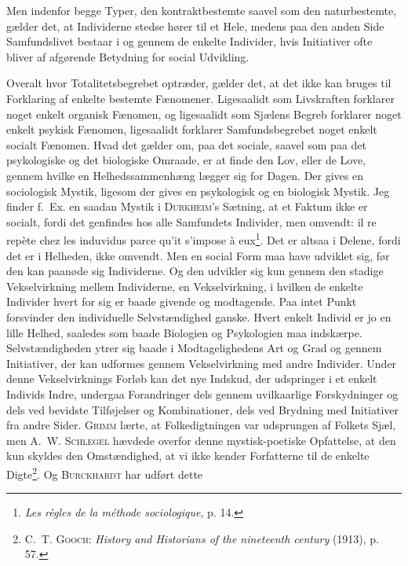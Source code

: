 \documentclass[12pt]{article}
\newcommand{\opage}[1]{\marginnote{\footnotesize\textit{[#1]}}}
\begin{document}
Men indenfor begge Typer, den kontraktbestemte saavel som den naturbestemte,
gælder det, at Individerne stedse hører til et Hele, medens paa den anden Side
Samfundslivet bestaar i og gennem de enkelte Individer, hvis Initiativer ofte
bliver af afgørende Betydning for social Udvikling.

Overalt hvor Totalitetsbegrebet optræder, gælder det, at det ikke kan bruges
til Forklaring af enkelte bestemte Fænomener. Ligesaalidt som Livskraften
forklarer noget enkelt organisk Fænomen, og ligesaalidt som Sjælens Begreb
forklarer noget enkelt psykisk Fænomen, ligesaalidt forklarer Samfundsbegrebet
noget enkelt socialt Fænomen. Hvad det gælder om, paa det sociale, saavel som paa
det psykologiske og det biologiske Omraade, er at finde den Lov, eller de Love,
gennem hvilke en Helhedssammenhæng lægger sig for Dagen. Der gives en sociologisk
\setcounter{footnote}{0}%
\opage{62}Mystik, ligesom der gives en psykologisk og en biologisk Mystik. Jeg finder
f.~Ex. en saadan Mystik i \textsc{Durkheim}'s Sætning, at et Faktum ikke er
socialt, fordi det genfindes hos alle Samfundets Individer, men omvendt:
il re repète chez les induvidus parce qu'it s'impose à
eux\footnote{\textit{Les règles de la méthode sociologique}, p. 14.}. Det er altsaa
i Delene, fordi det er i Helheden, ikke omvendt. Men en social Form maa have
udviklet sig, før den kan paanøde sig Individerne. Og den udvikler sig kun gennem
den stadige Vekselvirkning mellem Individerne, en Vekselvirkning, i hvilken de
enkelte Individer hvert for sig er baade givende og modtagende. Paa intet Punkt
forsvinder den individuelle Selvstændighed ganske. Hvert enkelt Individ er jo en
lille Helhed, saaledes som baade Biologien og Psykologien maa indskærpe.
Selvstændigheden ytrer sig baade i Modtagelighedens Art og Grad og gennem
Initiativer, der kan udformes gennem Vekselvirkning med andre Individer. Under
denne Vekselvirknings Forløb kan det nye Indskud, der udspringer i et enkelt
Individs Indre, undergaa Forandringer dels gennem uvilkaarlige Forskydninger og
dels ved bevidste Tilføjelser og Kombinationer, dels ved Brydning med Initiativer
fra andre Sider. \textsc{Grimm} lærte, at Folkedigtningen var udsprungen af
Folkets Sjæl, men \textsc{A.~W. Schlegel} hævdede overfor denne mystisk-poetiske
Opfattelse, at den kun skyldes den Omstændighed, at vi ikke kender Forfatterne til
de enkelte Digte\footnote{\textsc{C.~T. Gooch}: \textit{History and Historians of
the nineteenth century} (1913), p. 57.}. Og \textsc{Burckhardt} har udført dette
\end{document}
